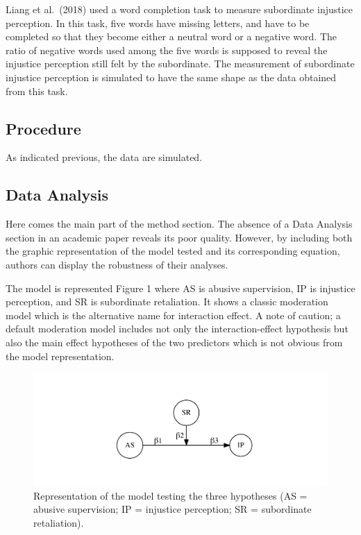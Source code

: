 \documentclass[
]{article}
\begin{document}
Liang et al.~(2018) used a word completion task to measure subordinate
injustice perception. In this task, five words have missing letters, and
have to be completed so that they become either a neutral word or a
negative word. The ratio of negative words used among the five words is
supposed to reveal the injustice perception still felt by the
subordinate. The measurement of subordinate injustice perception is
simulated to have the same shape as the data obtained from this task.

\hypertarget{procedure}{%
\subsection{Procedure}\label{procedure}}

As indicated previous, the data are simulated.

\hypertarget{data-analysis}{%
\subsection{Data Analysis}\label{data-analysis}}

Here comes the main part of the method section. The absence of a Data
Analysis section in an academic paper reveals its poor quality. However,
by including both the graphic representation of the model tested and its
corresponding equation, authors can display the robustness of their
analyses.

The model is represented Figure 1 where AS is abusive supervision, IP is
injustice perception, and SR is subordinate retaliation. It shows a
classic moderation model which is the alternative name for interaction
effect. A note of caution; a default moderation model includes not only
the interaction-effect hypothesis but also the main effect hypotheses of
the two predictors which is not obvious from the model representation.

\begin{figure}
\centering
\includegraphics{voodoo_paper_dd_files/figure-latex/unnamed-chunk-1-1.pdf}
\caption{Representation of the model testing the three hypotheses (AS =
abusive supervision; IP = injustice perception; SR = subordinate
retaliation).}
\end{figure}
\end{document}
